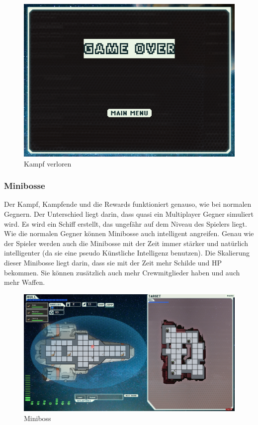 \documentclass[fontsize=12pt,paper=a4,twoside]{scrartcl}
\begin{document}
\begin{figure}[H]
\centering
\includegraphics[width=1\linewidth]{DasSpiel/Kampf/fightlose.png}
\caption{Kampf verloren}
\end{figure}

\subsubsection{Minibosse}

Der Kampf, Kampfende und die Rewards funktioniert genauso, wie bei normalen Gegnern. Der Unterschied liegt darin, dass quasi ein Multiplayer Gegner simuliert wird. Es wird ein Schiff erstellt, das ungefähr auf dem Niveau des Spielers liegt. Wie die normalen Gegner können Minibosse auch intelligent angreifen. Genau wie der Spieler werden auch die Minibosse mit der Zeit immer stärker und natürlich intelligenter (da sie eine pseudo Künstliche Intelligenz benutzen). Die Skalierung dieser Minibosse liegt darin, dass sie mit der Zeit mehr Schilde und HP bekommen. Sie können zusätzlich auch mehr Crewmitglieder haben und auch mehr Waffen. 

\begin{figure}[H]
\centering
\includegraphics[width=1\linewidth]{DasSpiel/Kampf/miniboss.png}
\caption{Miniboss}
\end{figure}
\end{document}
